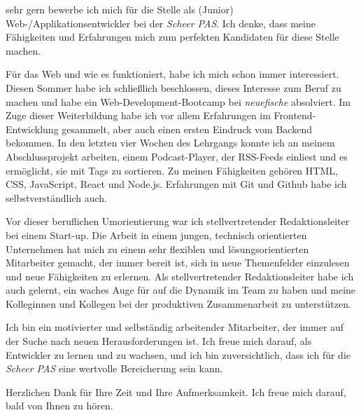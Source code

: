 \documentclass[11pt, a4paper]{awesome-cv}
\begin{document}
\makecvheader[R]


\makelettertitle

\begin{cvletter}

sehr gern bewerbe ich mich für die Stelle als (Junior) Web-/Applikationsentwickler bei der \emph{Scheer PAS}. Ich denke, dass meine Fähigkeiten und Erfahrungen mich zum perfekten Kandidaten für diese Stelle machen.

Für das Web und wie es funktioniert, habe ich mich schon immer interessiert. Diesen Sommer habe ich schließlich beschlossen, dieses Interesse zum Beruf zu machen und habe ein Web-Development-Bootcamp bei \emph{neuefische} absolviert. Im Zuge dieser Weiterbildung habe ich vor allem Erfahrungen im Frontend-Entwicklung gesammelt, aber auch einen ersten Eindruck vom Backend bekommen. In den letzten vier Wochen des Lehrgangs konnte ich an meinem Abschlussprojekt arbeiten, einem Podcast-Player, der RSS-Feeds einliest und es ermöglicht, sie mit Tags zu sortieren. Zu meinen Fähigkeiten gehören HTML, CSS, JavaScript, React und Node.js. Erfahrungen mit Git und Github habe ich selbstverständlich auch.

Vor dieser beruflichen Umorientierung war ich  stellvertretender Redaktionsleiter bei einem Start-up. Die Arbeit in einem jungen, technisch orientierten Unternehmen hat mich zu einem sehr flexiblen und lösungsorientierten Mitarbeiter gemacht, der immer bereit ist, sich in neue Themenfelder einzulesen und neue Fähigkeiten zu erlernen. Als stellvertretender Redaktionsleiter habe ich auch gelernt, ein waches Auge für auf die Dynamik im Team zu haben und meine Kolleginnen und Kollegen bei der produktiven Zusammenarbeit zu unterstützen.
  
Ich bin ein motivierter und selbständig arbeitender Mitarbeiter, der immer auf der Suche nach neuen Herausforderungen ist. Ich freue mich darauf, als Entwickler zu lernen und zu wachsen, und ich bin zuversichtlich, dass ich für die \emph{Scheer PAS} eine wertvolle Bereicherung sein kann.
  
Herzlichen Dank für Ihre Zeit und Ihre Aufmerksamkeit. Ich freue mich darauf, bald von Ihnen zu hören.


\end{cvletter}


\makeletterclosing
\end{document}
